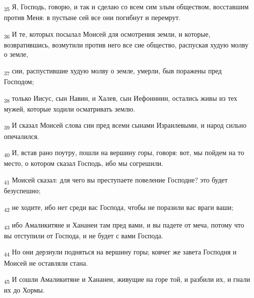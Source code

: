 \begin{tcolorbox}
\textsubscript{35} Я, Господь, говорю, и так и сделаю со всем сим злым обществом, восставшим против Меня: в пустыне сей все они погибнут и перемрут.
\end{tcolorbox}
\begin{tcolorbox}
\textsubscript{36} И те, которых посылал Моисей для осмотрения земли, и которые, возвратившись, возмутили против него все сие общество, распуская худую молву о земле,
\end{tcolorbox}
\begin{tcolorbox}
\textsubscript{37} сии, распустившие худую молву о земле, умерли, быв поражены пред Господом;
\end{tcolorbox}
\begin{tcolorbox}
\textsubscript{38} только Иисус, сын Навин, и Халев, сын Иефонниин, остались живы из тех мужей, которые ходили осматривать землю.
\end{tcolorbox}
\begin{tcolorbox}
\textsubscript{39} И сказал Моисей слова сии пред всеми сынами Израилевыми, и народ сильно опечалился.
\end{tcolorbox}
\begin{tcolorbox}
\textsubscript{40} И, встав рано поутру, пошли на вершину горы, говоря: вот, мы пойдем на то место, о котором сказал Господь, ибо мы согрешили.
\end{tcolorbox}
\begin{tcolorbox}
\textsubscript{41} Моисей сказал: для чего вы преступаете повеление Господне? это будет безуспешно;
\end{tcolorbox}
\begin{tcolorbox}
\textsubscript{42} не ходите, ибо нет среди вас Господа, чтобы не поразили вас враги ваши;
\end{tcolorbox}
\begin{tcolorbox}
\textsubscript{43} ибо Амаликитяне и Хананеи там пред вами, и вы падете от меча, потому что вы отступили от Господа, и не будет с вами Господа.
\end{tcolorbox}
\begin{tcolorbox}
\textsubscript{44} Но они дерзнули подняться на вершину горы; ковчег же завета Господня и Моисей не оставляли стана.
\end{tcolorbox}
\begin{tcolorbox}
\textsubscript{45} И сошли Амаликитяне и Хананеи, живущие на горе той, и разбили их, и гнали их до Хормы.
\end{tcolorbox}
